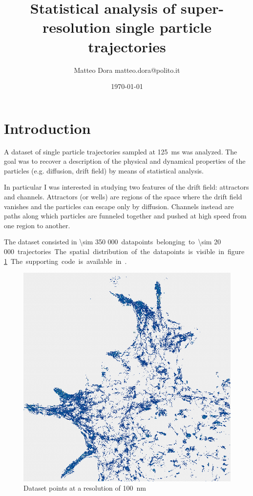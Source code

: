 \documentclass[a4paper]{article}
\title{Statistical analysis of super-resolution single particle trajectories}
\author{Matteo Dora \newline\newline \small{\mbox{matteo.dora@polito.it}}}
\date{\today}
\begin{document}
\maketitle

\section{Introduction}

A dataset of single particle trajectories sampled at \SI{125}{ms} was analyzed. The goal was to recover a description of the physical and dynamical properties of the particles (e.g. diffusion, drift field) by means of statistical analysis.

In particular I was interested in studying two features of the drift field: attractors and channels. Attractors (or wells) are regions of the space where the drift field vanishes and the particles can escape only by diffusion. Channels instead are paths along which particles are funneled together and pushed at high speed from one region to another.

The dataset consisted in \SI{\sim 350 000} datapoints belonging to \SI{\sim 20 000} trajectories. The spatial distribution of the datapoints is visible in figure \ref{fig:datapoints}. The supporting code is available in \cite{code}.

\begin{figure}[h]
  \includegraphics[width=\linewidth]{img/01_datapoints.png}
  \caption{Dataset points at a resolution of \SI{100}{nm}}
  \label{fig:datapoints}
\end{figure}
\end{document}
